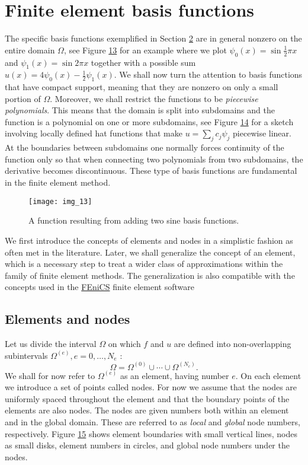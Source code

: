 \documentclass[../main.tex]{subfiles}
\begin{document}
	\chapter{Finite element basis functions}
	\label{chap:chap_3}
	\noindent The specific basis functions exemplified in Section \hyperref[chap:chap_2]{2} are in general nonzero on the entire domain $\Omega$, see Figure \hyperref[fig:img_13]{13} for an example where we plot $\psi_{0}(x)=\sin \frac{1}{2} \pi x$ and $\psi_{1}(x)=\sin 2 \pi x$ together with a possible sum $u(x)=4 \psi_{0}(x)-\frac{1}{2} \psi_{1}(x)$. We shall now turn the attention to basis functions that have compact support, meaning that they are nonzero on only a small portion of $\Omega$. Moreover, we shall restrict the functions to be \textit{piecewise polynomials}. This means that the domain is split into subdomains and the function is a polynomial on one or more subdomains, see Figure \hyperref[fig:img_14]{14} for a sketch involving locally defined hat functions that make $u=\sum_{j} c_{j} \psi_{j}$ piecewise linear. At the boundaries between subdomains one normally forces continuity of the function only so that when connecting two polynomials from two subdomains, the derivative becomes discontinuous. These type of basis functions are fundamental in the finite element method.
	\begin{figure}[H]
		\centering
		\texttt{[image: img\_13]}
		\caption{A function resulting from adding two sine basis functions.}
		\label{fig:img_13}
	\end{figure}
	We first introduce the concepts of elements and nodes in a simplistic fashion
	as often met in the literature. Later, we shall generalize the concept of an
	element, which is a necessary step to treat a wider class of approximations within
	the family of finite element methods. The generalization is also compatible with
	the concepts used in the \href{https://fenicsproject.org/}{FEniCS} finite element software
	\section[Elements and nodes]{Elements and nodes}
	\label{sec:sec_3_1}
	Let us divide the interval $\Omega$ on which $f$ and $u$ are defined into non-overlapping subintervals $\Omega^{(e)}, e=0, \ldots, N_{e}$ :
	\begin{equation}\label{eqa51}
		\Omega=\Omega^{(0)} \cup \cdots \cup \Omega^{\left(N_{c}\right)}.
	\end{equation}
	We shall for now refer to $\Omega^{(e)}$ as an element, having number $e$. On each element we introduce a set of points called nodes. For now we assume that the nodes are uniformly spaced throughout the element and that the boundary points of the elements are also nodes. The nodes are given numbers both within an element and in the global domain. These are referred to as \textit{local} and \textit{global} node numbers, respectively. Figure \hyperref[fig:img_15]{15} shows element boundaries with small vertical lines, nodes as small disks, element numbers in circles, and global node numbers under the nodes.
	
\end{document}
